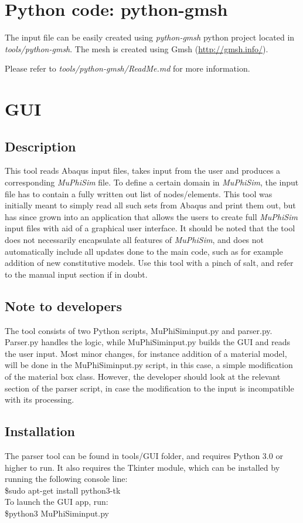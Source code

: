 \documentclass[oneside,11pt,times]{book}
\begin{document}
\section{Python code: python-gmsh}
The input file can be easily created using \emph{python-gmsh} python project located in \emph{tools/python-gmsh}. The mesh is created using Gmsh (\hyperlink{http://gmsh.info/}{http://gmsh.info/}). 

Please refer to \emph{tools/python-gmsh/ReadMe.md} for more information.


\section{GUI}
\subsection{Description}
This tool reads Abaqus input files, takes input from the user and produces a corresponding \textit{MuPhiSim} file. To define a certain domain in \textit{MuPhiSim}, the input file has to contain a fully written out list of nodes/elements. This tool was initially meant to simply read all such sets from Abaqus and print them out, but has since grown into an application that allows the users to create full \textit{MuPhiSim} input files with aid of a graphical user interface. It should be noted that the tool does not necessarily encapsulate all features of \textit{MuPhiSim}, and does not automatically include all updates done to the main code, such as for example addition of new constitutive models. Use this tool with a pinch of salt, and refer to the manual input section if in doubt.
\subsection {Note to developers}
The tool consists of two Python scripts, MuPhiSiminput.py and parser.py. Parser.py handles the logic, while MuPhiSiminput.py builds the GUI and reads the user input. Most minor changes, for instance addition of a material model, will be done in the MuPhiSiminput.py script, in this case, a simple modification of the material box class. However, the developer should look at the relevant section of the parser script, in case the modification to the input is incompatible with its processing.
\subsection{Installation}
The parser tool can be found in tools/GUI folder, and requires Python 3.0 or higher to run. It also requires the Tkinter module, which can be installed by running the following console line:\\
\$sudo apt-get install python3-tk\\
To launch the GUI app, run:\\
\$python3 MuPhiSiminput.py\\
\end{document}
